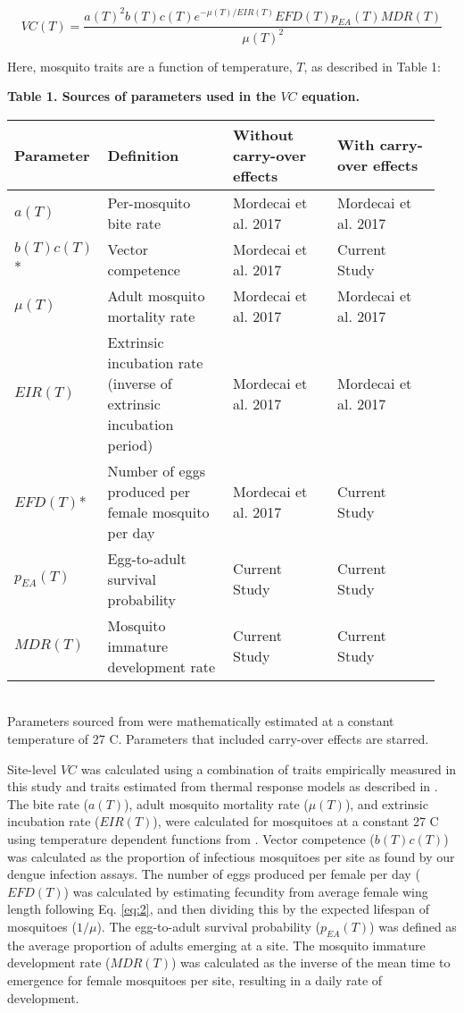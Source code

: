 \documentclass{bmcart}
\begin{document}
\begin{equation} \label{eq:3}
VC(T) =\frac{a(T)^2b(T)c(T)e^{-\mu (T)/EIR(T)} EFD(T) p_{EA}(T) MDR(T)} {\mu(T)^2}
\end{equation}

Here, mosquito traits are a function of temperature, $T$, as described in Table 1:

\begin{table}[h]
\begin{flushleft}
\textbf{Table 1. Sources of parameters used in the $VC$ equation.}
\end{flushleft}
\begin{tabular}{|P{0.15\linewidth}P{0.3\linewidth}P{0.25\linewidth}P{0.25\linewidth}|}
\hline
\textbf{Parameter} & \textbf{Definition} & \textbf{Without carry-over effects} & \textbf{With carry-over effects}\\
\hline
$a(T)$ & Per-mosquito bite rate & Mordecai et al. 2017 & Mordecai et al. 2017 \\
$b(T)c(T)$* & Vector competence & Mordecai et al. 2017 & Current Study \\
$\mu(T)$ & Adult mosquito mortality rate & Mordecai et al. 2017 & Mordecai et al. 2017 \\
$EIR(T)$ & Extrinsic incubation rate (inverse of extrinsic incubation period) & Mordecai et al. 2017 & Mordecai et al. 2017 \\
$EFD(T)$* & Number of eggs produced per female mosquito per day & Mordecai et al. 2017 & Current Study \\
$p_{EA}(T)$ & Egg-to-adult survival probability & Current Study & Current Study \\
$MDR(T)$ & Mosquito immature development rate & Current Study & Current Study \\
\hline
\end{tabular}
\\[1.5pt]

Parameters sourced from \citep{mordecai2017} were mathematically estimated at a constant temperature of 27 \degree C. Parameters that included carry-over effects are starred.
\end{table}

Site-level $VC$ was calculated using a combination of traits empirically measured in this study and traits estimated from thermal response models as described in \citep{mordecai2017}.
The bite rate ($a(T)$), adult mosquito mortality rate ($\mu(T)$), and extrinsic incubation rate ($EIR(T)$), were calculated for mosquitoes at a constant 27 \degree C using temperature dependent functions from \citep{mordecai2017}.
Vector competence ($b(T)c(T)$) was calculated as the proportion of infectious mosquitoes per site as found by our dengue infection assays.
The number of eggs produced per female per day ($EFD(T)$) was calculated by estimating fecundity from average female wing length following Eq. \ref{eq:2}, and then dividing this by the expected lifespan of mosquitoes ($1/\mu$).
The egg-to-adult survival probability ($p_{EA}(T)$) was defined as the average proportion of adults emerging at a site.
The mosquito immature development rate ($MDR(T)$) was calculated as the inverse of the mean time to emergence for female mosquitoes per site, resulting in a daily rate of development.
\end{document}
